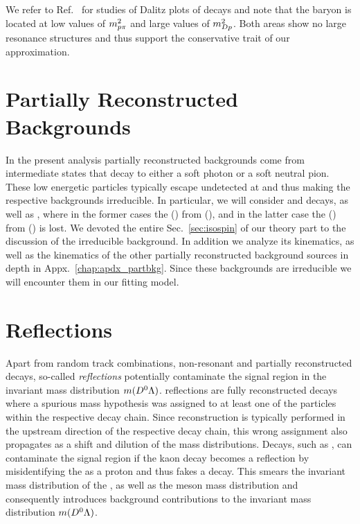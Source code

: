 We refer to Ref.~\cite{LbToDzphAndLch} for studies of Dalitz plots of \decay{\Lb}{\Dz\proton\pim} decays and note that the \Lz baryon is located at low values of $m^2_{{p}{\pi}}$ and large values of $m^2_{D{p}}$.
Both areas show no large resonance structures and thus support the conservative trait of our approximation.

\section{Partially Reconstructed Backgrounds}
\label{sec:bkgs_part}
In the present analysis partially reconstructed backgrounds come from intermediate states that decay to either a soft photon or a soft neutral pion.
These low energetic particles typically escape undetected at \lhcb and thus making the respective backgrounds irreducible.
In particular, we will consider \decay{\Lb/\Xibz}{\Dz\Sz} and \decay{\Xibz}{\Dz\Xiz} decays, as well as \decay{\Lb/\Xibz}{\Dstarz\Lz}, where in the former cases the \Pgamma (\piz) from \decay{\Sz}{\Lz\Pgamma} (\decay{\Xiz}{\Lz\piz}), and in the latter case the \Pgamma (\piz) from \decay{\Dstarz}{\Dz\Pgamma} (\decay{\Dstarz}{\Dz\piz}) is lost.
We devoted the entire Sec.~\ref{sec:isospin} of our theory part to the discussion of the irreducible \decay{\Sz}{\Lz\Pgamma} background.
In addition we analyze its kinematics, as well as the kinematics of the other partially reconstructed background sources in depth in Appx.~\ref{chap:apdx_partbkg}.
Since these backgrounds are irreducible we will encounter them in our fitting model.

\section{Reflections}
\label{sec:bkgs_refl}
Apart from random track combinations, non-resonant and partially reconstructed decays, so-called \textit{\glspl{reflection}} potentially contaminate the signal region in the invariant mass distribution $m({{D}^0}{\Lambda})$.
\Glspl{reflection} are fully reconstructed decays where a spurious mass hypothesis was assigned to at least one of the particles within the respective decay chain.
Since reconstruction is typically performed in the upstream direction of the respective decay chain, this wrong assignment also propagates as a shift and dilution of the mass distributions.
Decays, such as \decay{\Bsb}{\Dz\KS}, can contaminate the signal region if the kaon decay \decay{\KS}{\pip\pim} becomes a \gls{reflection} by misidentifying the \pip as a proton and thus fakes a \decay{\Lz}{\proton\pim} decay.
This smears the invariant mass distribution of the \KS, as well as the \Bs meson mass distribution and consequently introduces background contributions to the invariant mass distribution $m({{D}^0}{\Lambda})$.

